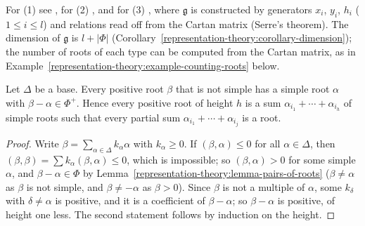 For (1) see \cite[Section 14.1]{humphreys-lie}, for (2) \cite[Sections 14 and 16]{humphreys-lie}, and for (3) \cite[Section 18]{humphreys-lie}, where $\mathfrak{g}$ is constructed by
generators $x_i$, $y_i$, $h_i$ ($1 \leq i \leq l$) and relations read off from the Cartan matrix (Serre's theorem). The dimension of $\mathfrak{g}$ is $l + |\Phi|$
(Corollary~\ref{representation-theory:corollary-dimension}); the number of roots of each type can be computed from the Cartan matrix, as in
Example~\ref{representation-theory:example-counting-roots} below.

\begin{lemma}\label{representation-theory:lemma-positive-roots-chain}
Let $\Delta$ be a base. Every positive root $\beta$ that is not simple has a simple root $\alpha$ with $\beta - \alpha \in \Phi^+$. Hence every positive root of height $h$ is a sum
$\alpha_{i_1} + \cdots + \alpha_{i_h}$ of simple roots such that every partial sum $\alpha_{i_1} + \cdots + \alpha_{i_j}$ is a root.
\end{lemma}

\begin{proof}
Write $\beta = \sum_{\alpha \in \Delta}k_\alpha\alpha$ with $k_\alpha \geq 0$. If $(\beta, \alpha) \leq 0$ for all $\alpha \in \Delta$, then $(\beta, \beta) = \sum k_\alpha(\beta, \alpha) \leq 0$, which is
impossible; so $(\beta, \alpha) > 0$ for some simple $\alpha$, and $\beta - \alpha \in \Phi$ by Lemma~\ref{representation-theory:lemma-pairs-of-roots} ($\beta \neq \alpha$ as $\beta$ is not
simple, and $\beta \neq -\alpha$ as $\beta > 0$). Since $\beta$ is not a multiple of $\alpha$, some $k_\delta$ with $\delta \neq \alpha$ is positive, and it is a coefficient of $\beta - \alpha$;
so $\beta - \alpha$ is positive, of height one less. The second statement follows by induction on the height.
\end{proof}

